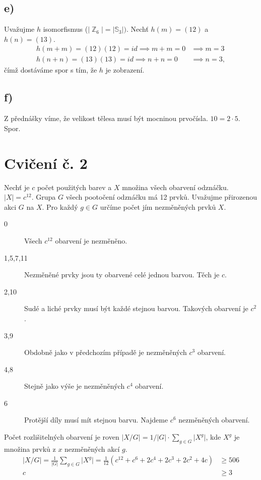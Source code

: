 \documentclass{scrartcl}
\DeclareMathOperator{\Z}{\mathbb{Z}}
\begin{document}
    \subsection*{e)}
    Uvažujme $h$ isomorfismus ($\vert \Z_6 \vert = \vert \mathbb{S}_3 \vert)$. Nechť $h(m) = (12)$ a $h(n) = (13)$. 
    \begin{align*}
        h(m+m) = (12)(12) = id \implies m+m = 0 &\implies m = 3\\
        h(n+n) = (13)(13) = id \implies n+n = 0 &\implies n = 3,
    \end{align*}
    čímž dostáváme spor s tím, že $h$ je zobrazení.
    \subsection*{f)}
    Z přednášky víme, že velikost tělesa musí být mocninou prvočísla. $10 = 2 \cdot 5$. Spor.

    \section*{Cvičení č. 2}
    Nechť je $c$ počet použitých barev a $X$ množina všech obarvení odznáčku. $\vert X \vert = c^{12}$. Grupa $G$ všech pootočení  odznáčku má 12 prvků. Uvažujme přirozenou akci $G$ na $X$. Pro každý $g \in G$ určíme počet jím nezměněných prvků $X$.
    \begin{description}
        \item[0] Všech $c^{12}$ obarvení je nezměněno.
        \item[1,5,7,11] Nezměněné prvky jsou ty obarvené celé jednou barvou. Těch je $c$.
        \item[2,10] Sudé a liché prvky musí být každé stejnou barvou. Takových obarvení je $c^2$.
        \item[3,9] Obdobně jako v předchozím případě je nezměněných $c^3$ obarvení. 
        \item[4,8] Stejně jako výše je nezměněných $c^4$ obarvení.
        \item[6] Protější díly musí mít stejnou barvu. Najdeme $c^6$ nezměněných obarvení.
    \end{description} 

    Počet rozlišitelných obarvení je roven $\vert X/G\vert = 1/\vert G\vert \cdot \sum_{g \in G} \vert X^g \vert$, kde $X^g$ je množina prvků z $x$ nezměněných akcí $g$.
    \begin{align*}
        \vert X/G\vert = \frac{1}{\vert G\vert}\sum_{g \in G} \vert X^g \vert = \frac{1}{12}(c^{12} + c^6 + 2c^4 + 2c^3 + 2c^2 + 4c) &\geq 506 \\
        c &\geq 3
    \end{align*}
\end{document}
